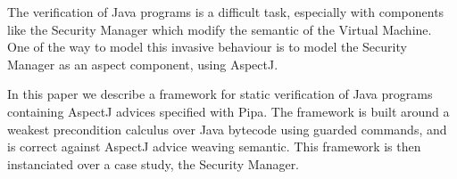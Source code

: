 The verification of Java programs is a difficult task, especially with
components like the Security Manager which modify the semantic of the
Virtual Machine.  One of the way to model this invasive behaviour is
to model the Security Manager as an aspect component, using AspectJ.

In this paper we describe a framework for static verification of Java
programs containing AspectJ advices specified with Pipa.  The
framework is built around a weakest precondition calculus over Java
bytecode using guarded commands, and is correct against AspectJ advice weaving semantic.
This framework is then instanciated over a case study, the Security
Manager.

